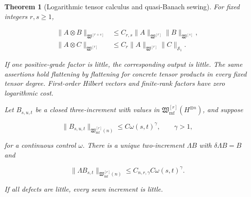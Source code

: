 \documentclass[10pt,reqno]{amsart}
\theoremstyle{plain}
\newtheorem{theorem}{Theorem}[section]
\theoremstyle{definition}
\theoremstyle{remark}
\begin{document}
\begin{theorem}[Logarithmic tensor calculus and quasi-Banach sewing]
\label{cc:gen-theorem-product-sewing}
For fixed integers \(r,s\geq1\),

\begin{align}
 \|A\otimes B\|_{\mathfrak W^{[r+s]}}
 &\leq C_{r,s}
 \|A\|_{\mathfrak W^{[r]}}
 \|B\|_{\mathfrak W^{[s]}},
 \label{cc:gen-log-product}\\
 \|A\otimes C\|_{\mathfrak W^{[r]}}
 &\leq C_r
 \|A\|_{\mathfrak W^{[r]}}\|C\|_{\mathcal S_1}.
 \label{cc:gen-trace-product}
\end{align}

If one positive-grade factor is little, the corresponding output is little.
The same assertions hold flattening by flattening for concrete tensor
products in every fixed tensor degree.  First-order Hilbert vectors and
finite-rank factors have zero logarithmic cost.

Let \(B_{s,u,t}\) be a closed three-increment with values in
\(\mathfrak W_{\mathrm{mf}}^{[r]}(H^{\otimes n})\), and suppose

\[
 \|B_{s,u,t}\|_{\mathfrak W_{\mathrm{mf}}^{[r]}(n)}
 \leq C\omega(s,t)^\gamma,
 \qquad \gamma>1,
\]

for a continuous control \(\omega\).  There is a unique two-increment
\(\Lambda B\) with \(\delta\Lambda B=B\) and

\begin{equation}
 \|\Lambda B_{s,t}\|_{\mathfrak W_{\mathrm{mf}}^{[r]}(n)}
 \leq C_{n,r,\gamma}C\omega(s,t)^\gamma.
 \label{cc:gen-sewing-bound}
\end{equation}

If all defects are little, every sewn increment is little.
\end{theorem}
\end{document}

